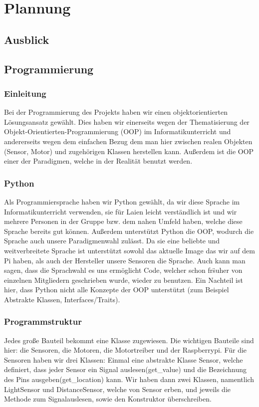 \documentclass{report}
\begin{document}
\chapter{Plannung}

\section{Ausblick}

\section{Programmierung}

\subsection{Einleitung}
Bei der Programmierung des Projekts haben wir einen objektorientierten L\"{o}sungsansatz gew\"{a}hlt. Dies haben wir einerseits wegen der Thematisierung der Objekt-Orientierten-Programmierung (OOP) im Informatikunterricht und andererseits wegen dem einfachen Bezug dem man hier zwischen realen Objekten (Sensor, Motor) und zugeh\"{o}rigen Klassen herstellen kann. Au{\ss}erdem ist die OOP einer der Paradigmen, welche in der Realit\"{a}t benutzt werden. 

\subsection{Python}
Als Programmiersprache haben wir Python gew\"{a}hlt, da wir diese Sprache im Informatikunterricht verwenden, sie f\"{u}r Laien leicht verst\"{a}ndlich ist und wir mehrere Personen in der Gruppe bzw. dem nahen Umfeld haben, welche diese Sprache bereits gut k\"{o}nnen. Au{\ss}erdem unterst\"{u}tzt Python die OOP, wodurch die Sprache auch unsere Paradigmenwahl zul\"{a}sst. Da sie eine beliebte und weitverbreitete Sprache ist unterst\"{u}tzt sowohl das aktuelle Image das wir auf dem Pi haben, als auch der Hersteller unsere Sensoren die Sprache. Auch kann man sagen, dass die Sprachwahl es uns erm\"{o}glicht Code, welcher schon fr\"s{u}her von einzelnen Mitgliedern geschrieben wurde, wieder zu benutzen.  Ein Nachteil ist hier, dass Python nicht alle Konzepte der OOP unterst\"{u}tzt (zum Beispiel Abstrakte Klassen, Interfaces/Traits).

\subsection{Programmstruktur}
Jedes gro{\ss}e Bauteil bekommt eine Klasse zugewiesen. Die wichtigen Bauteile sind hier: die Sensoren, die Motoren, die Motortreiber und der Raspberrypi. F\"{u}r die Sensoren haben wir drei Klassen: Einmal eine abstrakte Klasse Sensor, welche definiert, dass jeder Sensor ein Signal auslesen(get\_value) und die Bezeichnung des Pins ausgeben(get\_location) kann. Wir haben dann zwei Klassen, namentlich LightSensor und DistanceSensor, welche von Sensor erben, und jeweils die Methode zum Signalauslesen, sowie den Konstruktor \"{u}berschreiben.
\end{document}
